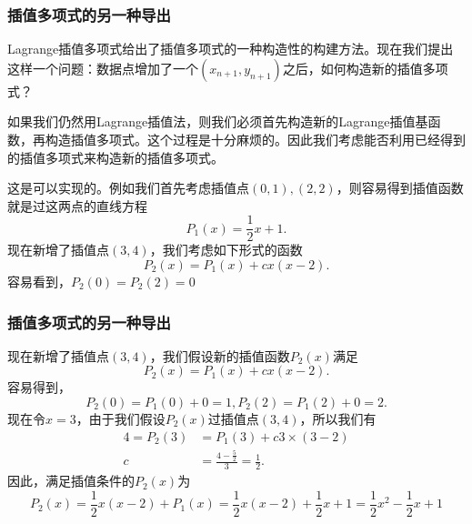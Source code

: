 \documentclass[10pt]{beamer}
\begin{document}
\begin{frame}
\frametitle{插值多项式的另一种导出}
Lagrange插值多项式给出了插值多项式的一种构造性的构建方法。现在我们提出这样一个问题：数据点增加了一个$(x_{n+1}, y_{n+1})$之后，如何构造新的插值多项式？

\vspace{0.2cm}

如果我们仍然用Lagrange插值法，则我们必须首先构造新的Lagrange插值基函数，再构造插值多项式。这个过程是十分麻烦的。因此我们考虑能否利用已经得到的插值多项式来构造新的插值多项式。

\vspace{0.2cm}

这是可以实现的。例如我们首先考虑插值点$(0,1), (2,2)$，则容易得到插值函数就是过这两点的直线方程
\begin{equation}
P_1 (x)= \frac{1}{2} x + 1.
\end{equation}
现在新增了插值点$(3,4)$，我们考虑如下形式的函数
\begin{equation}
P_2(x) = P_1(x) + cx(x-2).
\end{equation}
容易看到，$P_2(0) = P_2(2) =0$
\end{frame}


\begin{frame}
\frametitle{插值多项式的另一种导出}
现在新增了插值点$(3,4)$，我们假设新的插值函数$P_2(x)$满足
\begin{equation}
P_2(x) = P_1(x) + cx(x-2).
\end{equation}
容易得到，
\begin{equation}
P_2(0) = P_1(0) + 0 = 1, P_2(2) = P_1(2) + 0 = 2.
\end{equation}
现在令$x = 3$，由于我们假设$P_2(x)$过插值点$(3,4)$，所以我们有
\begin{align}
4 = P_2(3) & = P_1(3) + c3\times(3-2) \nonumber \\
               c & = \frac{4 - \frac{5}{2}}{3} = \frac{1}{2}.
\end{align}
因此，满足插值条件的$P_2(x)$为
\begin{equation}
P_2(x) = \frac{1}{2} x(x-2) + P_1(x) =  \frac{1}{2} x(x-2) + \frac{1}{2} x + 1 =  \frac{1}{2} x^2 - \frac{1}{2} x + 1
\end{equation}
\end{frame}
\end{document}
